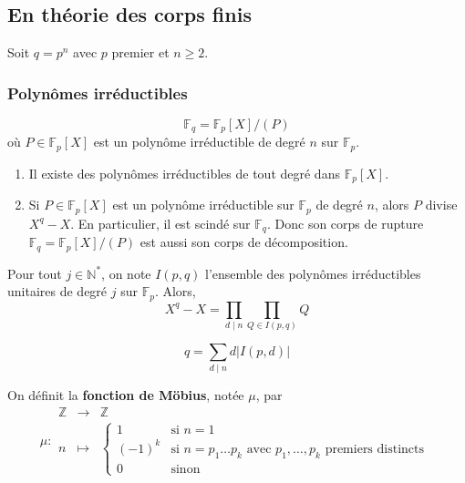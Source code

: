   \subsection{En théorie des corps finis}
  
  Soit $q = p^n$ avec $p$ premier et $n \geq 2$.
  
  \subsubsection{Polynômes irréductibles}
  
  
  \begin{theorem}
    \[ \mathbb{F}_q = \mathbb{F}_p[X] / (P) \]
    où $P \in \mathbb{F}_p[X]$ est un polynôme irréductible de degré $n$ sur $\mathbb{F}_p$.
  \end{theorem}
  
  \begin{corollary}
    \begin{enumerate}[label=(\roman*)]
      \item Il existe des polynômes irréductibles de tout degré dans $\mathbb{F}_p[X]$.
      \item Si $P \in \mathbb{F}_p[X]$ est un polynôme irréductible sur $\mathbb{F}_p$ de degré $n$, alors $P$ divise $X^q - X$. En particulier, il est scindé sur $\mathbb{F}_q$. Donc son corps de rupture $\mathbb{F}_q = \mathbb{F}_p[X] / (P)$ est aussi son corps de décomposition.
    \end{enumerate}
  \end{corollary}
  
  \begin{theorem}
    Pour tout $j \in \mathbb{N}^*$, on note $I(p,q)$ l'ensemble des polynômes irréductibles unitaires de degré $j$ sur $\mathbb{F}_p$. Alors,
    \[ X^q - X = \prod_{d \mid n} \prod_{Q \in I(p,q)} Q \]
  \end{theorem}
  
  \begin{corollary}
    \[ q = \sum_{d \mid n} d \vert I(p,d) \vert \]
  \end{corollary}
  
  \begin{definition}
    On définit la \textbf{fonction de Möbius}, notée $\mu$, par
    \[
    \mu :
    \begin{array}{ccc}
      \mathbb{Z} &\rightarrow& \mathbb{Z} \\
      n &\mapsto& \begin{cases}
        1 &\text{si } n = 1 \\
        (-1)^k &\text{si } n = p_1 \dots p_k \text{ avec } p_1, \dots, p_k \text{ premiers distincts} \\
        0 &\text{sinon}
      \end{cases}
    \end{array}
    \]
  \end{definition}
  
